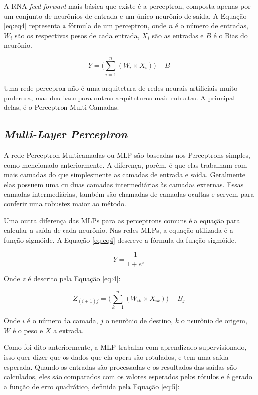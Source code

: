 A \ac{RNA} \textit{feed forward} mais básica que existe é a perceptron, composta apenas por um conjunto de neurônios de entrada e um único neurônio de saída. A Equação \ref{eq:eq4} representa a fórmula de um perceptron, onde $n$ é o número de entradas, $W_i$ são os respectivos pesos de cada entrada, $X_i$ são as entradas e $B$ é o Bias do neurônio.

\begin{equation}
Y=\Big(\sum_{i=1}^{n}{(W_i \times X_i)}\Big) - B
\label{eq:eq4}
\end{equation}

Uma rede percepron não é uma arquitetura de redes neurais artificiais muito poderosa, mas deu base para outras arquiteturas mais robustas. A principal delas, é o Perceptron Multi-Camadas.

\subsection{\textit{Multi-Layer Perceptron}}
\label{subsecao:2:2:2}


A rede Perceptron Multicamadas ou \ac{MLP} são baseadas nos Perceptrons simples, como mencionado anteriormente. A diferença, porém, é que elas trabalham com mais camadas do que simplesmente as camadas de entrada e saída. Geralmente elas possuem uma ou duas camadas intermediárias às camadas externas. Essas camadas intermediárias, também são chamadas de camadas ocultas e servem para conferir uma robustez maior ao método.

Uma outra diferença das \ac{MLP}s para as perceptrons comuns é a equação para calcular a saída de cada neurônio. Nas redes \ac{MLP}s, a equação utilizada é a função sigmóide. A Equação \ref{eq:eq4} descreve a fórmula da função sigmóide.

\begin{equation}
Y= \dfrac{1}{1+e^z}
\label{eq:eq5}
\end{equation}

Onde $z$ é descrito pela Equação \ref{eq:4}:

\begin{equation}
Z_{(i+1) j} = \Big(\sum_{k=1}^{n} (W_{i k}\times X_{i k})\Big)-B_j
\label{eq:4}
\end{equation}

Onde $i$ é o número da camada, $j$ o neurônio de destino, $k$ o neurônio de origem, $W$ é o peso e $X$ a entrada.

Como foi dito anteriormente, a \ac{MLP} trabalha com aprendizado supervisionado, isso quer dizer que os dados que ela opera são rotulados, e tem uma saída esperada. Quando as entradas são processadas e os resultados das saídas são calculados, eles são comparados com os valores esperados pelos rótulos e é gerado a função de erro quadrático, definida pela Equação \ref{eq:5}:

